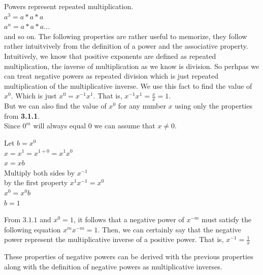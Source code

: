 \documentclass[12pt]{report}
\begin{document}
Powers represent repeated multiplication.\medskip\\
$a^3=a*a*a$\\
$a^n=a*a*a\dots$\\
and so on.
The following properties are rather useful to memorize, they follow rather intuitvively from the definition of a power and the associative property.
Intuitively, we know that positive exponents are defined as repeated multiplication, the inverse of multiplication as we know is division. So perhpas we can treat negative powers as repeated division which is just repeated multiplication of the multiplicative inverse. We use this fact to find the value of $x^0$. Which is just $x^0=x^{-1}x^1$. That is, $x^{-1}x^1=\frac{x}{x}=1$.\\
But we can also find the value of $x^0$ for any number $x$ using only the properties from \textbf{3.1.1}.\\
Since $0^m$ will always equal 0 we can assume that $x\neq 0$.

\noindent Let $b=x^0$\smallskip\\
$x=x^1=x^{1+0}=x^{1}x^{0}$\\
$x=xb$\\
Multiply both sides by $x^{-1}$\\
by the first property $x^1x^{-1}=x^0$\\
$x^0=x^0b$\\
$b=1$

From $3.1.1$ and $x^0=1$, it follows that a negative power of $x^{-m}$ must satisfy the following equation $x^m x^{-m}=1$. Then, we can certainly say that the negative power represent the multiplicative inverse of a positive power. That is, $x^{-1}=\frac{1}{x}$\medskip

These properties of negative powers can be derived with the previous properties along with the definition of negative powers as multiplicative inverses.
\end{document}
